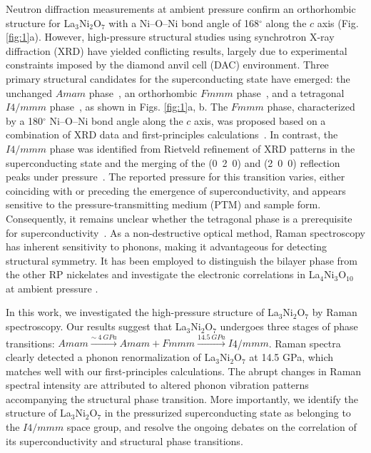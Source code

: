 \documentclass[prx,aps,twocolumn,preprintnumbers,amsmath,amssymb,superscriptaddress,showpacs]{revtex4-2}
\begin{document}
Neutron diffraction measurements at ambient pressure confirm an orthorhombic structure for La$_3$Ni$_2$O$_7$ with a Ni--O--Ni bond angle of 168$^\circ$ along the $c$ axis (Fig. \ref{fig:1}a). However, high-pressure structural studies using synchrotron X-ray diffraction (XRD) have yielded conflicting results, largely due to experimental constraints imposed by the diamond anvil cell (DAC) environment. Three primary structural candidates for the superconducting state have emerged: the unchanged $Amam$ phase~\cite{Shi2025p}, an orthorhombic $Fmmm$ phase~\cite{Sun2023,Li2025i}, and a tetragonal $I4/mmm$ phase~\cite{Wang2024s,Wang2025c}, as shown in Figs. \ref{fig:1}a, b. The $Fmmm$ phase, characterized by a 180$^\circ$ Ni--O--Ni bond angle along the $c$ axis, was proposed based on a combination of XRD data and first-principles calculations~\cite{Sun2023, Zhang2024h, Zhang2024eff,Li2025i}. In contrast, the $I4/mmm$ phase was identified from Rietveld refinement of XRD patterns in the superconducting state and the merging of the (0~2~0) and (2~0~0) reflection peaks under pressure~\cite{Puphal2024, Wang2025c,Wang2024s}. The reported pressure for this transition varies, either coinciding with or preceding the emergence of superconductivity, and appears sensitive to the pressure-transmitting medium (PTM) and sample form. Consequently, it remains unclear whether the tetragonal phase is a prerequisite for superconductivity~\cite{Shi2025p}. As a non-destructive optical method, Raman spectroscopy has inherent sensitivity to phonons, making it advantageous for detecting structural symmetry. It has been employed to distinguish the bilayer phase from the other RP nickelates \cite{Li2025d} and investigate the electronic correlations in La$_4$Ni$_3$O$_{10}$ at ambient pressure \cite{suthar2025,Gim2025,Zhang2025d}.

In this work, we investigated the high-pressure structure of La$_3$Ni$_2$O$_7$ by Raman spectroscopy. Our results suggest that La$_3$Ni$_2$O$_7$ undergoes three stages of phase transitions: $Amam$$\xrightarrow{ \sim\ 4 \ GPa}$$Amam+Fmmm$$\xrightarrow{ 14.5 \ GPa}$$I$4/$mmm$. Raman spectra clearly detected a phonon renormalization of La$_3$Ni$_2$O$_7$ at 14.5 GPa, which matches well with our first-principles calculations. The abrupt changes in Raman spectral intensity are attributed to altered phonon vibration patterns accompanying the structural phase transition. More importantly, we identify the structure of La$_3$Ni$_2$O$_7$ in the pressurized superconducting state as belonging to the $I4/mmm$ space group, and resolve the ongoing debates on the correlation of its superconductivity and structural phase transitions.
\end{document}
